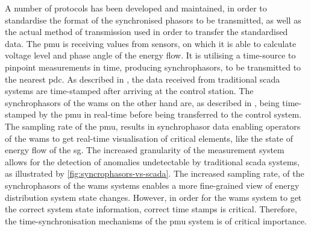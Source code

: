 A number of protocols has been developed and maintained, in order to standardise the format of the synchronised phasors to be transmitted, as well as the actual method of transmission used in order to transfer the standardised data.
The \acrshort{pmu} is receiving values from sensors, on which it is able to calculate voltage level and phase angle of the energy flow. It is utilising a time-source to pinpoint measurements in time, producing synchrophasors, to be transmitted to the nearest \acrshort{pdc}. 
As described in \cite{dagle2019importance}, the data received from traditional \acrshort{scada} systems are time-stamped after arriving at the control station. The synchrophasors of the \acrshort{wams} on the other hand are, as described in \cite{ali2016wide}, being time-stamped by the \acrshort{pmu} in real-time before being transferred to the control system. The sampling rate of the \acrshort{pmu}, results in synchrophasor data enabling operators of the \acrshort{wams} to get real-time visualisation of critical elements, like the state of energy flow  of the \acrlong{sg}. The increased granularity of the measurement system allows for the detection of anomalies undetectable by traditional \acrshort{scada} systems, as illustrated by \figureautorefname { }\ref{fig:syncrophasors-vs-scada}. 
The increased sampling rate, of the synchrophasors of the \acrshort{wams} systems enables a more fine-grained view of energy distribution system state changes. However, in order for the \acrshort{wams} system to get the correct system state information, correct time stamps is critical. 
Therefore, the time-synchronisation mechanisms of the \acrshort{pmu} system is of critical importance. \\ 

\begin{figure}
\end{figure}  


